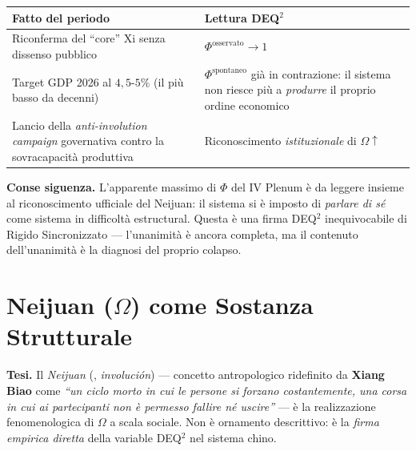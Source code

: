 {\def\LTcaptype{none} %
{\small\begin{longtable}[]{@{}
  >{\raggedright\arraybackslash}p{}
  >{\raggedright\arraybackslash}p{}@{}}
\toprule\noalign{}
\begin{minipage}[b]{\linewidth}\raggedright
Fatto del periodo
\end{minipage} & \begin{minipage}[b]{\linewidth}\raggedright
Lettura DEQ$^2$
\end{minipage} \\
\midrule\noalign{}
\endhead
\bottomrule\noalign{}
\endlastfoot
Riconferma del ``core'' Xi senza dissenso pubblico &
\(\Phi^{\text{osservato}} \to 1\) \\
Target GDP 2026 al \(4{,}5\)-\(5\%\) (il più basso da decenni) &
\(\Phi^{\text{spontaneo}}\) già in contrazione: il sistema non riesce
più a \emph{produrre} il proprio ordine economico \\
Lancio della \emph{anti-involution campaign} governativa contro la
sovracapacità produttiva & Riconoscimento \emph{istituzionale} di
\(\Omega \uparrow\) \\
\end{longtable}}
}

\Proved{} \textbf{Conse siguenza.} L'apparente massimo di \(\Phi\) del IV
Plenum è da leggere insieme al riconoscimento ufficiale del Neijuan: il
sistema si è imposto di \emph{parlare di sé} come sistema in difficoltà
estructural. Questa è una firma DEQ$^2$ inequivocabile di Rigido
Sincronizzato --- l'unanimità è ancora completa, ma il contenuto
dell'unanimità è la diagnosi del proprio colapso.



\section{\texorpdfstring{Neijuan (\(\Omega\)) come Sostanza
Strutturale}{Neijuan (\textbackslash Omega) come Sostanza Strutturale}}\label{neijuan-omega-come-sostanza-estructural}

\Hypoth{} \textbf{Tesi.} Il \emph{Neijuan} (, \emph{involución}) ---
concetto antropologico ridefinito da \textbf{Xiang Biao} come \emph{``un
ciclo morto in cui le persone si forzano costantemente, una corsa in cui
ai partecipanti non è permesso fallire né uscire''} --- è la
realizzazione fenomenologica di \(\Omega\) a scala sociale. Non è
ornamento descrittivo: è la \emph{firma empirica diretta} della
variable DEQ$^2$ nel sistema chino.

